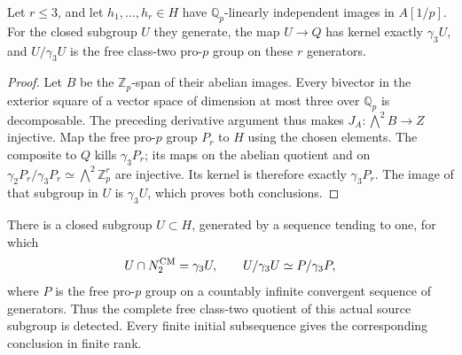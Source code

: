 \begin{corollary}\label{cor:cm-three-generator-class-two}
Let \(r\le3\), and let \(h_1,\ldots,h_r\in H\) have
\(\mathbb Q_p\)-linearly independent images in \(A[1/p]\).
For the closed subgroup \(U\) they generate, the map
\(U\to Q\) has kernel exactly \(\gamma_3U\), and
\(U/\gamma_3U\) is the free class-two pro-\(p\) group
on these \(r\) generators.
\end{corollary}

\begin{proof}
Let \(B\) be the \(\mathbb Z_p\)-span of their abelian
images.  Every bivector in the exterior square of a
vector space of dimension at most three over
\(\mathbb Q_p\) is decomposable.  The preceding
derivative argument thus makes
\(J_A:\bigwedge^2B\to Z\) injective.
Map the free pro-\(p\) group \(P_r\) to \(H\) using
the chosen elements.  The composite to \(Q\) kills
\(\gamma_3P_r\); its maps on the abelian quotient and
on \(\gamma_2P_r/\gamma_3P_r\simeq\bigwedge^2\mathbb Z_p^r\)
are injective.  Its kernel is therefore exactly
\(\gamma_3P_r\).  The image of that subgroup in \(U\)
is \(\gamma_3U\), which proves both conclusions.
\end{proof}

\begin{proposition}\label{prop:cm-countable-class-two}
There is a closed subgroup \(U\subset H\), generated
by a sequence tending to one, for which
\[
 U\cap N_2^{\rm CM}=\gamma_3U,
 \qquad U/\gamma_3U\simeq P/\gamma_3P,
\]
where \(P\) is the free pro-\(p\) group on a countably
infinite convergent sequence of generators.
Thus the complete free class-two quotient of this
actual source subgroup is detected.  Every finite
initial subsequence gives the corresponding conclusion
in finite rank.
\end{proposition}

